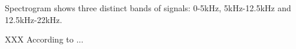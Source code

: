Spectrogram shows three distinct bands of signals: 0-5kHz, 5kHz-12.5kHz
and 12.5kHz-22kHz.

XXX According to \cite{mitra2010} ...
